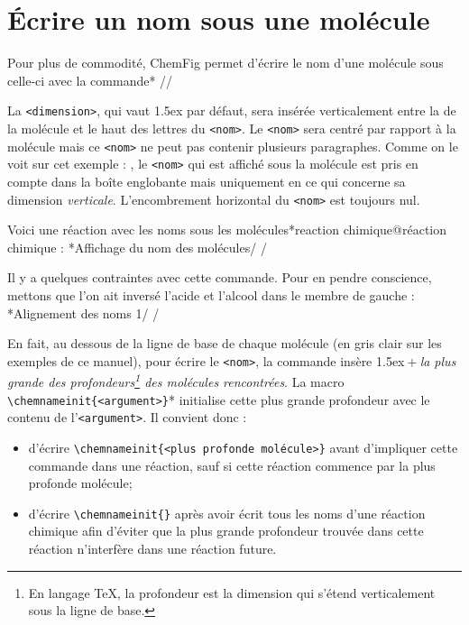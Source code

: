 \documentclass[10pt]{article}
\makeatletter
\newcommand\idx{\@ifstar{\let\print@or@not\@gobble\idx@}{\let\print@or@not\@firstofone\idx@}}
\newcommand\idx@[1]{%
	\ifcat\expandafter\noexpand\@car#1\@nil\relax%
		\expandafter\ifx\@car#1\@nil\protect
			\index{#1}%
			\print@or@not{#1}%
		\else
			\saveexpandmode\expandarg
			\StrSubstitute{\string#1}{\string @}{\@empty\protect\symbol{'100}}[\temp@]%
			\StrGobbleLeft\temp@1[\temp@]%
			\restoreexpandmode
			\expandafter\index\expandafter{\temp@ @\protect\texttt{\protect\textbackslash\temp@}}%
			\print@or@not{\texttt{\string#1}}%
		\fi
	\else
		\index{#1}%
		\print@or@not{#1}%
	\fi
}
\newcommand\make@car@active[2]{%
	\catcode`#1\active
	\begingroup
		\lccode`\~`#1\relax
		\lowercase{\endgroup\def~{#2}}%
}
\newif\if@exstar
\newcommand\exemple{%
	\begingroup
	\parskip\z@
	\@makeother\;\@makeother\!\@makeother\?\@makeother\:%
	\@ifstar{\@exstartrue\exemple@}{\@exstarfalse\exemple@}}
\newcommand\exemple@[2][65]{%
	\medbreak\noindent
	\begingroup
		\let\do\@makeother\dospecials
		\make@car@active\ { {}}%
		\make@car@active\^^M{\par\leavevmode}%
		\make@car@active\,{\leavevmode\kern\z@\string,}%
		\make@car@active\-{\leavevmode\kern\z@\string-}%
		\make@car@active\>{\leavevmode\kern\z@\string>}%
		\make@car@active\<{\leavevmode\kern\z@\string<}%
		\exemple@@{#1}{#2}%
}
\newcommand\exemple@@[3]{%
	\def\@tempa##1#3{\exemple@@@{#1}{#2}{##1}}%
	\@tempa
}
\newcommand\exemple@@@[3]{%
	\xdef\the@code{#3}%
	\endgroup
	\if@exstar
		\begingroup
			\fboxrule0.4pt
			\let\breakboxparindent\z@
			\def\bkvz@bottom{\hrule\@height\fboxrule}%
			\let\bkvz@before@breakbox\relax
			\def\bkvz@set@linewidth{\advance\linewidth\dimexpr-2\fboxrule-2\fboxsep}%
			\def\bkvz@left{\vrule\@width\fboxrule\hskip\fboxsep}%
			\def\bkvz@right{\hskip\fboxsep\vrule\@width\fboxrule}%
			\def\bkvz@top{\hbox to \hsize{%
				\vrule\@width\fboxrule\@height\fboxrule
				\leaders\bkvz@bottom\hfill
				\ECFAugie
				\fboxsep\z@
				\colorbox{black}{\kern0.25em\color{white}\footnotesize\lower0.5ex\hbox{\strut#2}\kern0.25em}%
				\leaders\bkvz@bottom\hfill
				\vrule\@width\fboxrule\@height\fboxrule}}%
			\breakbox
				\kern.5ex\relax
				\ttfamily\footnotesize\the@code\par
				\normalfont
				\kern3pt
				\hrule height0.1pt width\linewidth depth0.1pt
				\vskip5pt
				\rightskip0pt plus 1fill
				\everypar{{\color{lightgray}\rlap{\vrule height0.1pt width\linewidth depth0.1pt}}\hskip0pt plus 1fill}%
				\newlinechar`\^^M\everyeof{\noexpand}\scantokens{#3}\par
			\endbreakbox
		\endgroup
	\else
		\vskip0.5ex
		\boxput*(0,1)
			{\fboxsep\z@
			\hbox{\ECFAugie\colorbox{black}{\leavevmode\kern0.25em{\color{white}\footnotesize\strut#2}\kern0.25em}}%
			}%
			{\fboxsep5pt
			\fbox{%
				$\vcenter{\hsize\dimexpr0.#1\linewidth-\fboxsep-\fboxrule\relax
					\kern5pt\parskip0pt \ttfamily\footnotesize\the@code}%
				\vcenter{\kern5pt\hsize\dimexpr\linewidth-0.#1\linewidth-\fboxsep-\fboxrule\relax
					\everypar{{\color{lightgray}\rlap{\vrule height0.1pt width\dimexpr\linewidth-0.#1\linewidth-\fboxsep-\fboxrule depth0.1pt}}}%
					\footnotesize\newlinechar`\^^M\everyeof{\noexpand}\scantokens{#3}}$%
				}%
			}%
	\fi
	\medbreak
	\endgroup
}
\let\do\@makeother\dospecials
\newcommand\CF{{\ECFAugie ChemFig}\xspace}
\makeatother
\begin{document}
\section{Écrire un nom sous une molécule}\label{chemname}
Pour plus de commodité, \CF permet d'écrire le nom d'une molécule sous celle-ci avec la commande\idx*\chemname
\centerverb//
\smallskip

La \verb-<dimension>-, qui vaut 1.5ex par défaut, sera insérée verticalement entre la \idx{ligne de base} de la molécule et le haut des lettres du \verb-<nom>-. Le \verb-<nom>- sera centré par rapport à la molécule mais ce \verb-<nom>- ne peut pas contenir plusieurs paragraphes. Comme on le voit sur cet exemple : , le \verb-<nom>- qui est affiché sous la molécule est pris en compte dans la boîte englobante mais uniquement en ce qui concerne sa dimension \emph{verticale}. L'encombrement horizontal du \verb-<nom>- est toujours nul.

Voici une réaction avec les noms sous les molécules\idx*{reaction chimique@réaction chimique} :
\exemple*{Affichage du nom des molécules}/
\chemsign{+}
\chemrel{->}
\chemsign{+}
/

Il y a quelques contraintes avec cette commande. Pour en pendre conscience, mettons que l'on ait inversé l'acide et l'alcool dans le membre de gauche :
\exemple*{Alignement des noms 1}/
\chemsign{+}
\chemrel{->}
\chemsign{+}
/

En fait, au dessous de la ligne de base de chaque molécule (en gris clair sur les exemples de ce manuel), pour écrire le \verb-<nom>-, la commande \idx{\chemname} insère 1.5ex${}+{}$\emph{la plus grande des profondeurs\footnote{En langage \TeX{}, la profondeur est la dimension qui s'étend verticalement sous la ligne de base.} des molécules rencontrées}. \label{chemnameinit}La macro \verb-\chemnameinit{<argument>}-\idx*{\chemnameinit} initialise cette plus grande profondeur avec le contenu de l'\verb-<argument>-. Il convient donc :
\begin{itemize}
	\item d'écrire \verb-\chemnameinit{<plus profonde molécule>}- avant d'impliquer cette commande dans une réaction, sauf si cette réaction commence par la plus profonde molécule;
	\item d'écrire \verb-\chemnameinit{}- après avoir écrit tous les noms d'une réaction chimique afin d'éviter que la plus grande profondeur trouvée dans cette réaction n'interfère dans une réaction future.
\end{itemize}
\end{document}
